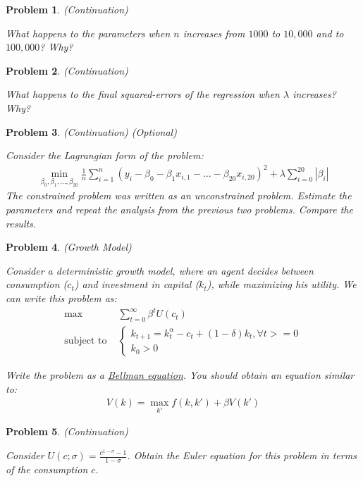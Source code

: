 \documentclass[12pt, a4paper]{article}
\newcommand{\abs}[1]{\left\vert{#1}\right\vert}
\newtheorem{problem}{Problem}
\begin{document}
\begin{problem}
(Continuation)

What happens to the parameters when \(n\) increases from \(1000\) to \(10,000\) and to \(100,000\)?
Why?
\end{problem}

\begin{problem}
(Continuation)

What happens to the final squared-errors of the regression when \(\lambda\) increases?
Why?
\end{problem}

\begin{problem}
(Continuation) (Optional)

Consider the Lagrangian form of the problem:
\begin{align*}
\min_{\beta_0,\beta_1,\ldots,\beta_{20}}{\frac{1}{n}\sum_{i=1}^n(y_i-\beta_0-\beta_1x_{i, 1} - \ldots - \beta_{20}x_{i, 20})^2 + \lambda\sum_{i=0}^{20}\abs{\beta_i}}
\end{align*}
The constrained problem was written as an unconstrained problem.
Estimate the parameters and repeat the analysis from the previous two problems.
Compare the results.
\end{problem}

\begin{problem}
(Growth Model)

Consider a deterministic growth model, where an agent decides between consumption (\(c_t\)) and investment in capital (\(k_t\)), while maximizing his utility.
We can write this problem as:
\begin{align*}
  \max&\sum_{t=0}^{\infty}\beta^tU(c_t)\\
  \text{subject to }&
                      \begin{cases}
                        k_{t+1} = k_t^{\alpha} - c_t + (1-\delta)k_t, \forall t >= 0\\
                        k_0 > 0
                      \end{cases}
\end{align*}

Write the problem as a \href{https://en.wikipedia.org/wiki/Bellman\_equation}{Bellman equation}.
You should obtain an equation similar to:
\begin{align*}
V(k) = \max_{k'}{f(k, k') + \beta V(k')}
\end{align*}
\end{problem}

\begin{problem}
(Continuation)

Consider \(U(c; \sigma)=\frac{c^{1-\sigma}-1}{1-\sigma}\).
Obtain the Euler equation for this problem in terms of the consumption \(c\).
\end{problem}
\end{document}
